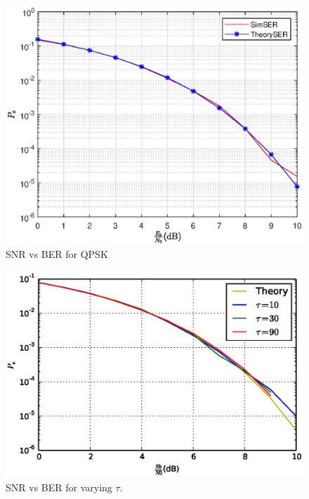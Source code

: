 \documentclass[journal,12pt,twocolumn]{IEEEtran}
\begin{document}
\begin{figure}[!ht]
\begin{center}
\includegraphics[width=\columnwidth]{./figs/QPSK1}
\end{center}
\caption{SNR vs BER for QPSK}
\label{fig:qpsk1}
\end{figure}
\begin{figure}
\begin{center}
\includegraphics[width=\columnwidth]{./figs/Different_timeoffsets_snrvsber.eps}
\end{center}
\caption{SNR vs BER for varying $\tau$.}
\label{fig:difftoff}
\end{figure}
%
\end{document}
